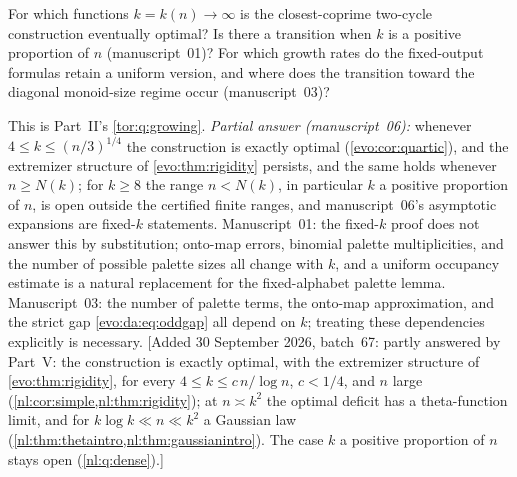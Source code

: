 \documentclass[11pt,a4paper]{article}
\numberwithin{equation}{section}
\theoremstyle{definition}
\theoremstyle{remark}
\begin{document}
\begin{question}\label{evo:q:growing}
For which functions $k=k(n)\to\infty$ is the closest-coprime two-cycle
construction eventually optimal? Is there a transition when $k$ is a positive
proportion of $n$ (manuscript~01)? For which growth rates do the fixed-output
formulas retain a uniform version, and where does the transition toward the
diagonal monoid-size regime occur (manuscript~03)?
\end{question}
This is Part~II's \cref{tor:q:growing}. \emph{Partial answer
(manuscript~06):} whenever $4\le k\le(n/3)^{1/4}$ the construction is exactly
optimal (\cref{evo:cor:quartic}), and the extremizer structure of
\cref{evo:thm:rigidity} persists, and the same holds whenever $n\ge N(k)$;
for $k\ge8$ the range $n<N(k)$, in particular $k$ a positive proportion of
$n$, is open outside the certified finite ranges, and manuscript~06's
asymptotic expansions are fixed-$k$ statements. Manuscript~01: the fixed-$k$
proof does not answer this by substitution; onto-map errors, binomial palette
multiplicities, and the number of possible palette sizes all change with $k$,
and a uniform occupancy estimate is a natural replacement for the
fixed-alphabet palette lemma. Manuscript~03: the number of palette terms, the
onto-map approximation, and the strict gap \eqref{evo:da:eq:oddgap} all depend
on $k$; treating these dependencies explicitly is necessary.
[Added 30 September 2026, batch~67: partly answered by Part~V: the construction is exactly
optimal, with the extremizer structure of \cref{evo:thm:rigidity}, for every
$4\le k\le c\,n/\log n$, $c<1/4$, and $n$ large
(\cref{nl:cor:simple,nl:thm:rigidity}); at $n\asymp k^2$ the optimal deficit
has a theta-function limit, and for $k\log k\ll n\ll k^2$ a Gaussian law
(\cref{nl:thm:thetaintro,nl:thm:gaussianintro}). The case $k$ a positive
proportion of $n$ stays open (\cref{nl:q:dense}).]
\end{document}
